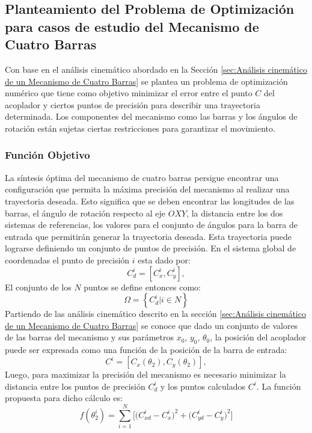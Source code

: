 \subsection{Planteamiento del Problema de Optimización para casos de estudio del Mecanismo de Cuatro Barras}
Con base en el análisis cinemático abordado en la Sección \ref{sec:Análisis cinemático de un Mecanismo de Cuatro Barras} se plantea un problema de optimización numérico que tiene como objetivo minimizar el error entre el punto $C$ del acoplador y ciertos puntos de precisión para describir una trayectoria determinada. Los componentes del mecanismo como las  barras y los ángulos de rotación están sujetas ciertas restricciones para garantizar el movimiento. 

\subsubsection{Función Objetivo}\label{sec:Funcion Objetivo de MEC}
La síntesis óptima del mecanismo de cuatro barras persigue encontrar una configuración que permita la máxima precisión del mecanismo al realizar una trayectoria deseada. Esto significa que se deben encontrar las longitudes de las barras, el ángulo de rotación respecto al eje $OXY$, la distancia entre los dos sistemas de referencias, los valores para el conjunto de ángulos para la barra de entrada que permitirán generar la trayectoria deseada. Esta trayectoria puede lograrse definiendo un conjunto de puntos de precisión. En el sistema global de coordenadas el punto de precisión $i$ esta dado por:
\begin{equation}
C^i_d=\left[C^i_x,C^i_y \right],
\end{equation}
El conjunto de los $N$ puntos se define entonces como:
\begin{equation}
\Omega=\left \{ C^i_d | i \in N \right \}
\end{equation}
Partiendo de las análisis cinemático descrito en la sección \ref{sec:Análisis cinemático de un Mecanismo de Cuatro Barras} se conoce que dado un conjunto de valores de las barras del mecanismo y sus parámetros $x_0$, $y_0$, $\theta_0$, la posición del acoplador puede ser expresada como una función de la posición de la barra de entrada: 
\begin{equation}
C^i=\left[C_x\left(\theta_2\right),C_y\left(\theta_2 \right) \right],
\end{equation}
Luego, para maximizar la precisión del mecanismo es necesario minimizar la distancia entre los puntos de precisión $C^i_d$ y los puntos calculados $C^i$. La función propuesta para dicho cálculo es:
\begin{equation}
f(\theta^i_2)= \sum_{i=1}^{N} \big[\big(C^{i}_{xd}-C^{i}_{x} \big)^2 +\big(C^{i}_{yd}-C^{i}_{y} \big)^2\big]
\end{equation}
